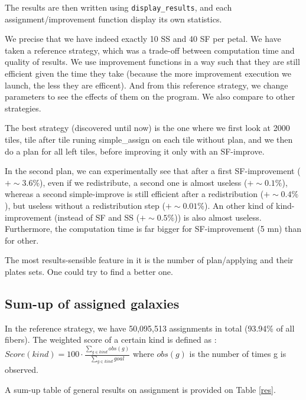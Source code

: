\documentclass{extarticle}
\begin{document}
The results are then written using {\tt display\_results}, and each assignment/improvement function display its own statistics.

We precise that we have indeed exactly 10 SS and 40 SF per petal. We have taken a reference strategy, which was a trade-off between computation time and quality of results. We use improvement functions in a way such that they are still efficient given the time they take (because the more improvement execution we launch, the less they are efficent). And from this reference strategy, we change parameters to see the effects of them on the program. We also compare to other strategies. 

The best strategy (discovered until now) is the one where we first look at 2000 tiles, tile after tile runing simple\_assign on each tile without plan, and we then do a plan for all left tiles, before improving it only with an SF-improve.

In the second plan, we can experimentally see that after a first SF-improvement ($+\sim 3.6\%$), even if we redistribute, a second one is almost useless ($+\sim 0.1\%$), whereas a second simple-improve is still efficient after a redistribution ($+\sim 0.4\%$), but useless without a redistribution step ($+\sim 0.01\%$). An other kind of kind-improvement (instead of SF and SS ($+\sim 0.5\%$)) is also almost useless. Furthermore, the computation time is far bigger for SF-improvement (5 mn) than for other.

The most results-sensible feature in it is the number of plan/applying and their plates sets. One could try to find a better one.


\subsection{Sum-up of assigned galaxies}
In the reference strategy, we have 50,095,513 assignments in total (93.94\% of all fibers). The weighted score of a certain kind is defined as : 
\vspace{1\baselineskip}
$Score(kind) = 100\cdot \frac{\sum\nolimits_{g \in kind} obs(g)}{\sum\nolimits_{g \in kind} goal}$ where $obs(g)$ is the number of times g is observed.

A sum-up table of general results on assignment is provided on Table \ref{res}.
\end{document}
